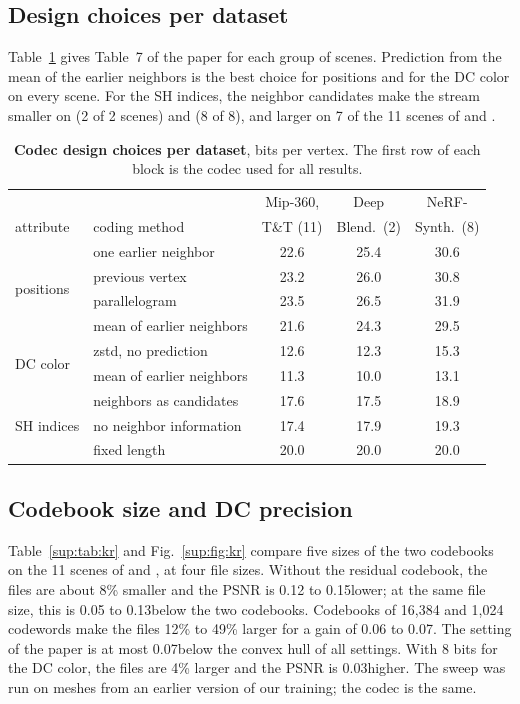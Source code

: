 \subsection{Design choices per dataset}
Table~\ref{sup:tab:choices} gives Table~7 of the paper for each group of scenes. Prediction from the mean of the earlier neighbors is the best choice for positions and for the DC color on every scene. For the SH indices, the neighbor candidates make the stream smaller on \DeepBlending (2 of 2 scenes) and \NeRFSyn (8 of 8), and larger on 7 of the 11 scenes of \MipNeRF and \TandT.

\begin{table}[!htb]\centering\footnotesize
\caption{\textbf{Codec design choices per dataset}, bits per vertex. The first row of each block is the codec used for all results.}
\label{sup:tab:choices}
\setlength{\tabcolsep}{3pt}
\begin{tabular}{@{}llccc@{}}
\toprule
 & & Mip-360, & Deep & NeRF- \\
attribute & coding method & T\&T (11) & Blend.\ (2) & Synth.\ (8) \\
\midrule
\multirow{4}{*}{positions} & one earlier neighbor & 22.6 & 25.4 & 30.6 \\
 & previous vertex & 23.2 & 26.0 & 30.8 \\
 & parallelogram & 23.5 & 26.5 & 31.9 \\
 & mean of earlier neighbors & 21.6 & 24.3 & 29.5 \\
\midrule
\multirow{2}{*}{DC color} & zstd, no prediction & 12.6 & 12.3 & 15.3 \\
 & mean of earlier neighbors & 11.3 & 10.0 & 13.1 \\
\midrule
\multirow{3}{*}{SH indices} & neighbors as candidates & 17.6 & 17.5 & 18.9 \\
 & no neighbor information & 17.4 & 17.9 & 19.3 \\
 & fixed length & 20.0 & 20.0 & 20.0 \\
\bottomrule
\end{tabular}
\end{table}

\subsection{Codebook size and DC precision}
Table~\ref{sup:tab:kr} and Fig.~\ref{sup:fig:kr} compare five sizes of the two codebooks on the 11 scenes of \MipNeRF and \TandT, at four file sizes. Without the residual codebook, the files are about 8\% smaller and the PSNR is 0.12 to 0.15\dB lower; at the same file size, this is 0.05 to 0.13\dB below the two codebooks. Codebooks of 16{,}384 and 1{,}024 codewords make the files 12\% to 49\% larger for a gain of 0.06 to 0.07\dB. The setting of the paper is at most 0.07\dB below the convex hull of all settings. With 8 bits for the DC color, the files are 4\% larger and the PSNR is 0.03\dB higher. The sweep was run on meshes from an earlier version of our training; the codec is the same.

